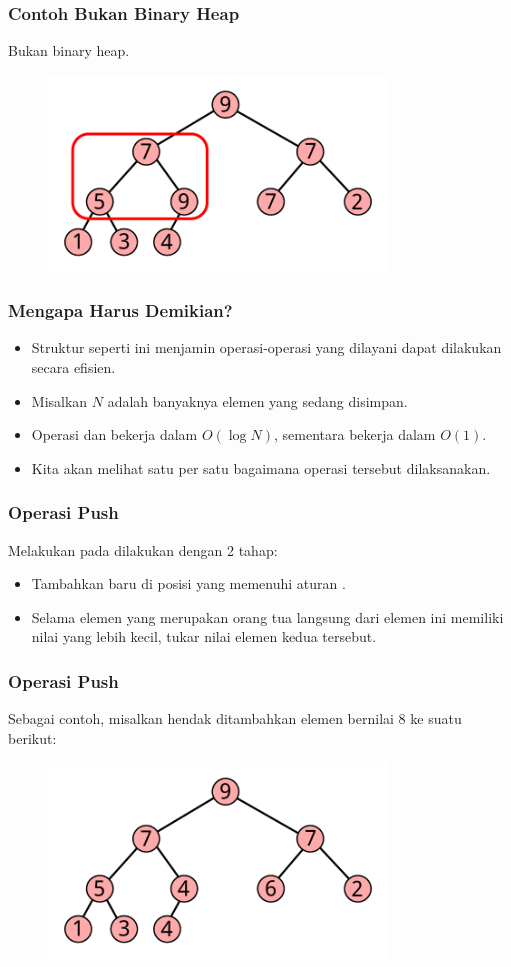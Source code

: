 \begin{frame}
\frametitle{Contoh Bukan Binary Heap}
Bukan binary heap.
\begin{figure}
  \includegraphics[width=9cm]{asset/not-heap.pdf}
\end{figure}
\end{frame}

\begin{frame}
\frametitle{Mengapa Harus Demikian?}
\begin{itemize}
  \item Struktur seperti ini menjamin operasi-operasi yang dilayani \pheap dapat dilakukan secara efisien.
  \item Misalkan $N$ adalah banyaknya elemen yang sedang disimpan.
  \item Operasi  dan  bekerja dalam $O(\log{N})$, sementara  bekerja dalam $O(1)$.
  \item Kita akan melihat satu per satu bagaimana operasi tersebut dilaksanakan.
\end{itemize}
\end{frame}

\begin{frame}
\frametitle{Operasi Push}
Melakukan  pada \pbinaryHeap dilakukan dengan 2 tahap:
\begin{itemize}
  \item Tambahkan \fnode baru di posisi yang memenuhi aturan .
  \item Selama elemen \fnode yang merupakan orang tua langsung dari elemen ini memiliki nilai yang lebih kecil, tukar nilai elemen kedua \fnode tersebut.
\end{itemize}
\end{frame}

\begin{frame}
\frametitle{Operasi Push}
Sebagai contoh, misalkan hendak ditambahkan elemen bernilai 8 ke suatu \pbinaryHeap berikut:
\begin{figure}
  \includegraphics[width=9cm]{asset/heap.pdf}
\end{figure}
\end{frame}

